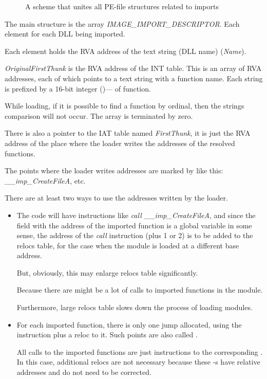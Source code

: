 \begin{figure}[H]
\centering
{}
\caption{
A scheme that unites all PE-file structures related to imports}
\end{figure}

The main structure is the array \emph{IMAGE\_IMPORT\_DESCRIPTOR}.
Each element for each DLL being imported.

Each element holds the \ac{RVA} address of the text string (DLL name) (\emph{Name}).

\emph{OriginalFirstThunk} is the \ac{RVA} address of the \ac{INT} table.
This is an array of \ac{RVA} addresses, each of which points to a text string with a function name.
Each string is prefixed by a 16-bit integer
()--- of function.

While loading, if it is possible to find a function by ordinal,
then the strings comparison will not occur. The array is terminated by zero.

There is also a pointer to the \ac{IAT} table named \emph{FirstThunk}, it is just the \ac{RVA} address
of the place where the loader writes the addresses of the resolved functions.

The points where the loader writes addresses are marked by \IDA like this: \emph{\_\_imp\_CreateFileA}, etc.

There are at least two ways to use the addresses written by the loader.

\begin{itemize}
\item The code will have instructions like \emph{call \_\_imp\_CreateFileA},
and since the field with the address of the imported function is a global variable in some sense,
the address of the \emph{call} instruction (plus 1 or 2) is to be added to the relocs table,
for the case when the module is loaded at a different base address.

But, obviously, this may enlarge relocs table significantly.

Because there are might be a lot of calls to imported functions in the module.

Furthermore, large relocs table slows down the process of loading modules.

\item For each imported function, there is only one jump allocated, using the \JMP instruction
plus a reloc to it.
Such points are also called .

All calls to the imported functions are just \CALL instructions to the corresponding .
In this case, additional relocs are not necessary because these \CALL{}-s
have relative addresses and do not need to be corrected.
\end{itemize}

